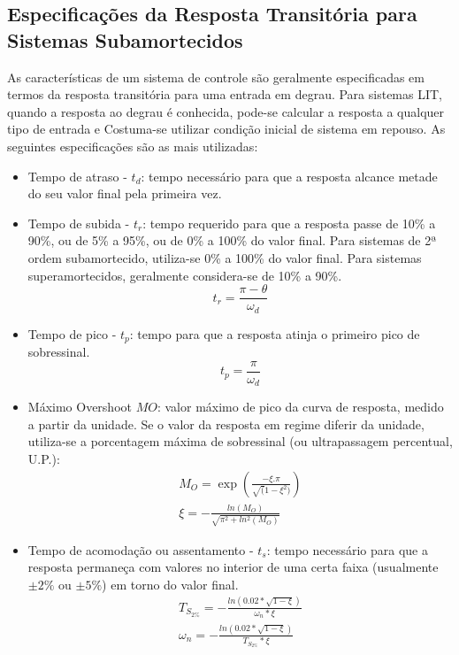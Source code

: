 \documentclass[a4paper]{ifacconf}
\begin{document}
    \subsection{Especificações da Resposta Transitória para Sistemas Subamortecidos}
    As características de um sistema de controle são geralmente especificadas em termos da resposta transitória para uma entrada em degrau. Para sistemas LIT, quando a resposta ao degrau é conhecida, pode-se calcular a resposta a qualquer tipo de entrada e Costuma-se utilizar condição inicial de sistema em repouso. As seguintes especificações são as mais utilizadas:
    \begin{itemize}
        \item  Tempo de atraso - $t_d$: tempo necessário para que a resposta alcance metade do seu valor final pela primeira vez.
        \item  Tempo de subida - $t_r$: tempo requerido para que a resposta passe de 10\% a 90\%, ou de 5\% a 95\%, ou de 0\% a 100\% do valor final. Para sistemas de 2ª ordem subamortecido, utiliza-se 0\% a 100\% do valor final. Para sistemas superamortecidos, geralmente considera-se de 10\% a 90\%.
        \begin{equation} \label{eq:tr}
            t_r = \frac{\pi-\theta}{\omega_d}
        \end{equation} 
        \item Tempo de pico - $t_p$: tempo para que a resposta atinja o primeiro pico de sobressinal.
        \begin{equation} \label{eq:tp}
            t_p = \frac{\pi}{\omega_d}
        \end{equation}
        \item Máximo Overshoot $MO$: valor máximo de pico da curva de resposta, medido a partir da unidade. Se o valor da resposta em regime diferir da unidade, utiliza-se a porcentagem máxima de sobressinal (ou ultrapassagem percentual, U.P.):
        \begin{equation} \label{eq:MO}
        \begin{split}
            M_O=\exp{(\frac{-\xi.\pi}{\sqrt(1-\xi^2)})}\\
            \xi=-\frac{ln\left( M_O \right)}{\sqrt{\pi^2+ln^2(M_O)}}    
        \end{split}
        \end{equation}
        \item Tempo de acomodação ou assentamento - $t_s$: tempo necessário para que a resposta permaneça com valores no interior de uma certa faixa (usualmente $\pm2\%$ ou $\pm5\%$) em torno do valor final.
        \begin{equation} \label{eq:Ts2}
        \begin{split}
            T_{S_{2\%}}=-\frac{ln\left( 0.02*\sqrt{1-\xi} \right)}{\omega_n*\xi}\\
            \omega_n=-\frac{ln\left( 0.02*\sqrt{1-\xi} \right)}{T_{S_{2\%}}*\xi}  
        \end{split}
        \end{equation}
    \end{itemize}
\end{document}
